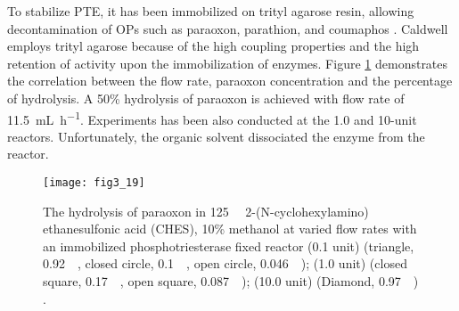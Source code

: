 \begin{refsection}
To stabilize PTE, it has been immobilized on trityl
agarose resin, allowing decontamination of OPs such as paraoxon, parathion, and
coumaphos \cite{Caldwell1991}. Caldwell  employs trityl agarose
because of the high coupling properties and the high retention of activity upon
the immobilization of enzymes. Figure \ref{fig:pte-app-imm} demonstrates the
correlation between the flow rate, paraoxon concentration and the percentage of
hydrolysis. A 50\% hydrolysis of paraoxon is achieved with flow rate of
\SI{11.5}{\mL\per\hour}. Experiments has been also conducted at the 1.0 and 10-unit
reactors. Unfortunately, the organic solvent dissociated the enzyme from the
reactor.
\begin{figure}[htbp] \centering \texttt{[image: fig3\_19]}
    \caption[The hydrolysis of paraoxon in \SI{125}{\milli\Molar}
        2-(N-cyclohexylamino)ethanesulfonic acid (CHES), 10\% methanol at
    varied flow rates with an immobilized phosphotriesterase fixed reactor (0.1
unit) (triangle, \SI{0.92}{\milli\Molar}, closed circle,
\SI{0.1}{\milli\Molar}, open circle, \SI{0.046}{\milli\Molar}); (1.0 unit)
(closed square, \SI{0.17}{\milli\Molar}, open square,
\SI{0.087}{\milli\Molar}); (10.0 unit) (Diamond, \SI{0.97}{\milli\Molar}).]{The
    hydrolysis of paraoxon in \SI{125}{\milli\Molar} 2-(N-cyclohexylamino)
    ethanesulfonic acid (CHES), 10\% methanol at varied flow rates with an
    immobilized phosphotriesterase fixed reactor (0.1 unit) (triangle,
    \SI{0.92}{\milli\Molar}, closed circle, \SI{0.1}{\milli\Molar}, open
    circle, \SI{0.046}{\milli\Molar}); (1.0 unit) (closed square,
    \SI{0.17}{\milli\Molar}, open square, \SI{0.087}{\milli\Molar}); (10.0
    unit) (Diamond, \SI{0.97}{\milli\Molar}) \cite{Caldwell1991}.}
    \label{fig:pte-app-imm}
\end{figure}


\end{refsection}
